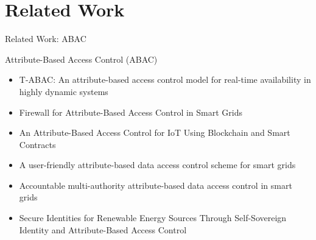 \documentclass[en]{sdqbeamer}
\begin{document}
\section{Related Work}
\begin{frame}{Related Work: ABAC}
    \begin{blueblock}{Attribute-Based Access Control (ABAC)}
        \begin{itemize}
            \item T-ABAC: An attribute-based access control model for real-time availability in highly dynamic systems \parencite{Burmester2013}
            \item Firewall for Attribute-Based Access Control in Smart Grids \parencite{Ruland2018}
            \item An Attribute-Based Access Control for IoT Using Blockchain and Smart Contracts \parencite{Zaidi2021}
            \item A user-friendly attribute-based data access control scheme for smart grids \parencite{Mu2023}
            \item Accountable multi-authority attribute-based data access control in smart grids \parencite{Zhang2023}
            \item Secure Identities for Renewable Energy Sources Through Self-Sovereign Identity and Attribute-Based Access Control \parencite{Volkmann2024}
        \end{itemize}
    \end{blueblock}
\end{frame}
\end{document}
